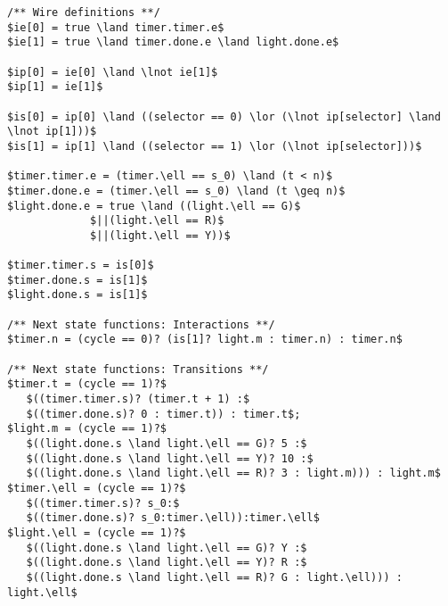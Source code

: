 \begin{lstlisting}[caption=Sample of \biptool{} generated code,label=sample:code:bip,float=bt]
/** Wire definitions **/
$ie[0] = true \land timer.timer.e$
$ie[1] = true \land timer.done.e \land light.done.e$

$ip[0] = ie[0] \land \lnot ie[1]$
$ip[1] = ie[1]$

$is[0] = ip[0] \land ((selector == 0) \lor (\lnot ip[selector] \land \lnot ip[1]))$
$is[1] = ip[1] \land ((selector == 1) \lor (\lnot ip[selector]))$

$timer.timer.e = (timer.\ell == s_0) \land (t < n)$
$timer.done.e = (timer.\ell == s_0) \land (t \geq n)$
$light.done.e = true \land ((light.\ell == G)$ 
             $||(light.\ell == R)$
             $||(light.\ell == Y))$
             
$timer.timer.s = is[0]$
$timer.done.s = is[1]$
$light.done.s = is[1]$

/** Next state functions: Interactions **/
$timer.n = (cycle == 0)? (is[1]? light.m : timer.n) : timer.n$

/** Next state functions: Transitions **/
$timer.t = (cycle == 1)?$ 
   $((timer.timer.s)? (timer.t + 1) :$
   $((timer.done.s)? 0 : timer.t)) : timer.t$;
$light.m = (cycle == 1)?$
   $((light.done.s \land light.\ell == G)? 5 :$
   $((light.done.s \land light.\ell == Y)? 10 :$
   $((light.done.s \land light.\ell == R)? 3 : light.m))) : light.m$
$timer.\ell = (cycle == 1)?$
   $((timer.timer.s)? s_0:$
   $((timer.done.s)? s_0:timer.\ell)):timer.\ell$
$light.\ell = (cycle == 1)?$
   $((light.done.s \land light.\ell == G)? Y :$
   $((light.done.s \land light.\ell == Y)? R :$
   $((light.done.s \land light.\ell == R)? G : light.\ell))) : light.\ell$
\end{lstlisting}
%
